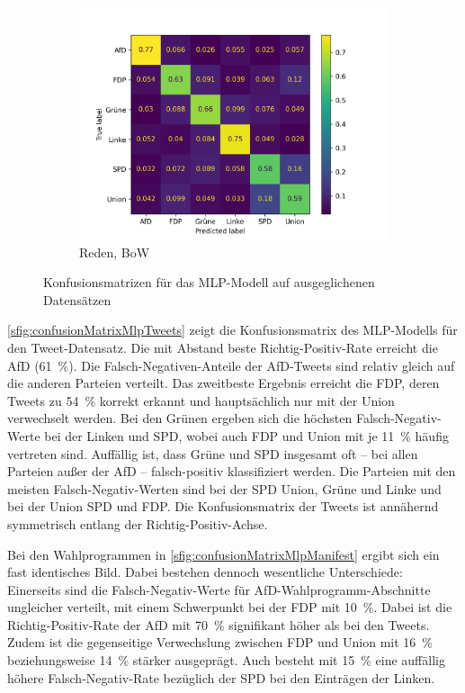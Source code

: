 \begin{figure}[H]
\begin{subfigure}{0.49\textwidth}
    \includegraphics[width=\textwidth]{data/images/modeling/mlp/under/speeches_confusion_matrix.png}
    \caption{Reden, \ac{BoW}}
    \label{sfig:confusionMatrixMlpSpeeches}
\end{subfigure}
\caption{Konfusionsmatrizen für das \acs{MLP}-Modell auf ausgeglichenen Datensätzen} \label{fig:confusionMatrixMlp}
\end{figure}

\autoref{sfig:confusionMatrixMlpTweets} zeigt die Konfusionsmatrix des \ac{MLP}-Modells für den Tweet-Datensatz. Die mit Abstand beste Richtig-Positiv-Rate erreicht die \ac{AfD} (\SI{61}{\percent}). Die Falsch-Negativen-Anteile der \ac{AfD}-Tweets sind relativ gleich auf die anderen Parteien verteilt. Das zweitbeste Ergebnis erreicht die \ac{FDP}, deren Tweets zu \SI{54}{\percent} korrekt erkannt und hauptsächlich nur mit der Union verwechselt werden. Bei den Grünen ergeben sich die höchsten Falsch-Negativ-Werte bei der Linken und \ac{SPD}, wobei auch \ac{FDP} und Union mit je \SI{11}{\percent} häufig vertreten sind. Auffällig ist, dass Grüne und \ac{SPD} insgesamt oft -- bei allen Parteien außer der \ac{AfD} -- falsch-positiv klassifiziert werden. Die Parteien mit den meisten Falsch-Negativ-Werten sind bei der \ac{SPD} Union, Grüne und Linke und bei der Union \ac{SPD} und \ac{FDP}. Die Konfusionsmatrix der Tweets ist annähernd symmetrisch entlang der Richtig-Positiv-Achse.

Bei den Wahlprogrammen in \autoref{sfig:confusionMatrixMlpManifest} ergibt sich ein fast identisches Bild. Dabei bestehen dennoch wesentliche Unterschiede: Einerseits sind die Falsch-Negativ-Werte für \ac{AfD}-Wahlprogramm-Abschnitte ungleicher verteilt, mit einem Schwerpunkt bei der \ac{FDP} mit \SI{10}{\percent}. Dabei ist die Richtig-Positiv-Rate der \ac{AfD} mit \SI{70}{\percent} signifikant höher als bei den Tweets. Zudem ist die gegenseitige Verwechslung zwischen \ac{FDP} und Union mit \SI{16}{\percent} beziehungsweise \SI{14}{\percent} stärker ausgeprägt. Auch besteht mit \SI{15}{\percent} eine auffällig höhere Falsch-Negativ-Rate bezüglich der \ac{SPD} bei den Einträgen der Linken.

